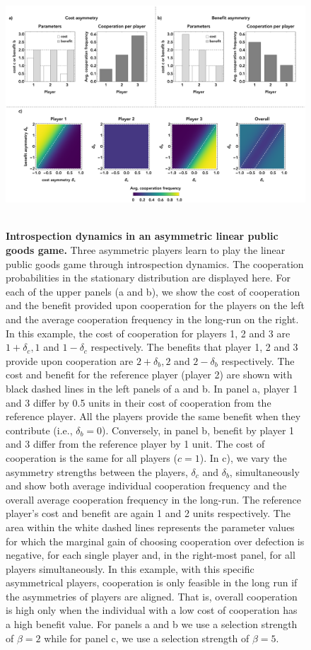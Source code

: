 \documentclass[11pt]{article}
\theoremstyle{plainCl1}
\theoremstyle{plainCl2}
\begin{document}
\clearpage
\begin{figure}
\centering
\includegraphics[width =  \textwidth]{figures/figure2.eps}~\\[0.4cm]
\caption{\onehalfspacing
\textbf{Introspection dynamics in an asymmetric linear public goods game.} Three asymmetric players learn to play the linear public goods game through introspection dynamics. The cooperation probabilities in the stationary distribution are displayed here. For each of the upper panels (a and b), we show the cost of cooperation and the benefit provided upon cooperation for the players on the left and the average cooperation frequency in the long-run on the right. In this example, the cost of cooperation for players 1, 2 and 3 are $1 + \delta_c, 1$ and $1 - \delta_c$ respectively. The benefits that player 1, 2 and 3 provide upon cooperation are $2 + \delta_b, 2$ and $2 - \delta_b$ respectively. The cost and benefit for the reference player (player 2) are shown with black dashed lines in the left panels of a and b. In panel a, player 1 and 3 differ by 0.5 units in their cost of cooperation from the reference player. All the players provide the same benefit when they contribute (i.e., $\delta_b = 0$). Conversely, in panel b, benefit by player 1 and 3 differ from the reference player by 1 unit. The cost of cooperation is the same for all players ($c = 1$). In c), we vary the asymmetry strengths between the players, $\delta_c $ and $\delta_b$, simultaneously and show both average individual cooperation frequency and the overall average cooperation frequency in the long-run. The reference player's cost and benefit are again 1 and 2 units respectively. The area within the white dashed lines represents the parameter values for which the marginal gain of choosing cooperation over defection is negative, for each single player and, in the right-most panel, for all players simultaneously. In this example, with this specific asymmetrical players, cooperation is only feasible in the long run if the asymmetries of players are aligned. That is, overall cooperation is high only when the individual with a low cost of cooperation has a high benefit value. For panels a and b we use a selection strength of $\beta = 2$ while for panel c, we use a selection strength of $\beta = 5$. 
}
\label{Fig:LPGG-asymmetric}
\end{figure}
\end{document}
